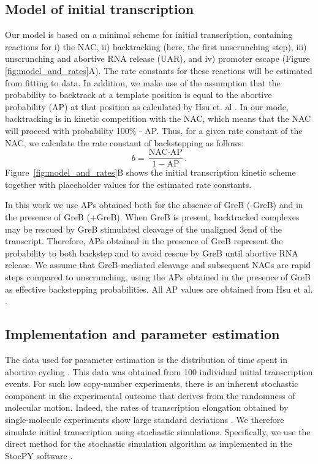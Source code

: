%
\subsection{Model of initial transcription}
Our model is based on a minimal scheme for initial transcription, containing
reactions for i) the NAC, ii) backtracking (here, the
first unscrunching step), iii) unscrunching and abortive RNA release (UAR), and iv)
promoter escape (Figure \ref{fig:model_and_rates}A). The rate constants
for these reactions will be estimated from
fitting to data. In addition, we make use of the assumption that the
probability to backtrack at a template position is equal to the abortive
probability (AP) at that position as calculated by Hsu et. al
\cite{hsu_initial_2006}. In our mode, backtracking is in kinetic competition
with the NAC, which means that the NAC will proceed with probability 100\% -
AP. Thus, for a given rate constant of the NAC, we calculate the rate constant
of backstepping as follows:
\begin{equation}
  b = \frac{\text{NAC}\cdot\text{AP}}{1-\text{AP}}.
  \label{eq:backtrackingcalc}
\end{equation}
Figure~\ref{fig:model_and_rates}B shows the initial transcription kinetic
scheme together with placeholder values for the estimated rate constants.

In this work we use APs obtained both for the absence of GreB (-GreB) and in
the presence of GreB (+GreB). When GreB is present, backtracked complexes may
be rescued by GreB stimulated cleavage of the unaligned 3\ppp end of the
transcript. Therefore, APs obtained in the presence of GreB represent the
probability to both backstep and to avoid rescue by GreB until abortive RNA
release. We assume that GreB-mediated cleavage and subsequent NACs are rapid
steps compared to unscrunching, using the APs obtained in the presence of GreB
as effective backstepping probabilities. All AP values are obtained from Hsu
et al. \cite{hsu_initial_2006}.

\subsection{Implementation and parameter estimation}
The data used for parameter estimation is the distribution of time spent in
abortive cycling \cite{revyakin_abortive_2006}. This data was obtained from
100 individual initial transcription events. For such low copy-number
experiments, there is an inherent stochastic component in the experimental
outcome that derives from the randomness of molecular motion. Indeed, the
rates of transcription elongation obtained by single-molecule experiments show
large standard deviations \cite{adelman_single_2002,
tolic-norrelykke_diversity_2004}. We therefore simulate initial transcription
using stochastic simulations. Specifically, we use the direct method for the
stochastic simulation algorithm \cite{gillespie_exact_1977} as implemented in
the StocPY software \cite{maarleveld_stochpy:_2013}. 

